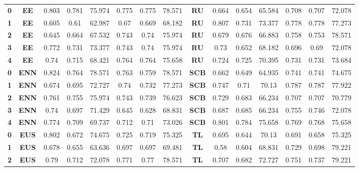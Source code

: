 {{\begin{tabular}{c|c|cccccc|ccccccc}
\textbf{0} & \textbf{EE} & 0.803 & 0.781 & 75.974 & 0.775 & 0.775 & 78.571 & \multicolumn{1}{c|}{\textbf{RU}} & 0.664 & 0.654 & 65.584 & 0.708 & 0.707 & 72.078 \\
\textbf{1} & \textbf{EE} & 0.605 & 0.61  & 62.987 & 0.67  & 0.669 & 68.182 & \multicolumn{1}{c|}{\textbf{RU}} & 0.807 & 0.731 & 73.377 & 0.778 & 0.778 & 77.273 \\
\textbf{2} & \textbf{EE} & 0.645 & 0.664 & 67.532 & 0.743 & 0.74  & 75.974 & \multicolumn{1}{c|}{\textbf{RU}} & 0.679 & 0.676 & 66.883 & 0.758 & 0.753 & 78.571 \\
\textbf{3} & \textbf{EE} & 0.772 & 0.731 & 73.377 & 0.743 & 0.74  & 75.974 & \multicolumn{1}{c|}{\textbf{RU}} & 0.73  & 0.652 & 68.182 & 0.696 & 0.69  & 72.078 \\
\textbf{4} & \textbf{EE} & 0.74  & 0.715 & 68.421 & 0.764 & 0.764 & 75.658 & \multicolumn{1}{c|}{\textbf{RU}} & 0.724 & 0.725 & 70.395 & 0.731 & 0.731 & 73.684 \\
\textbf{0} & \textbf{ENN} & 0.824 & 0.764 & 78.571 & 0.763 & 0.759 & 78.571 & \multicolumn{1}{c|}{\textbf{SCB}} & 0.662 & 0.649 & 64.935 & 0.741 & 0.741 & 74.675 \\
\textbf{1} & \textbf{ENN} & 0.674 & 0.695 & 72.727 & 0.74  & 0.732 & 77.273 & \multicolumn{1}{c|}{\textbf{SCB}} & 0.747 & 0.71  & 70.13 & 0.787 & 0.787 & 77.922 \\
\textbf{2} & \textbf{ENN} & 0.761 & 0.755 & 75.974 & 0.743 & 0.739 & 76.623 & \multicolumn{1}{c|}{\textbf{SCB}} & 0.729 & 0.683 & 66.234 & 0.707 & 0.707 & 70.779 \\
\textbf{3} & \textbf{ENN} & 0.74  & 0.697 & 71.429 & 0.645 & 0.628 & 68.831 & \multicolumn{1}{c|}{\textbf{SCB}} & 0.687 & 0.685 & 66.234 & 0.755 & 0.746 & 72.078 \\
\textbf{4} & \textbf{ENN} & 0.774 & 0.709 & 69.737 & 0.712 & 0.71  & 73.026 & \multicolumn{1}{c|}{\textbf{SCB}} & 0.801 & 0.784 & 75.658 & 0.769 & 0.768 & 75.658 \\
\textbf{0} & \textbf{EUS} & 0.802 & 0.672 & 74.675 & 0.725 & 0.719 & 75.325 & \multicolumn{1}{c|}{\textbf{TL}} & 0.695 & 0.644 & 70.13 & 0.691 & 0.658 & 75.325 \\
\textbf{1} & \textbf{EUS} & 0.678 & 0.655 & 63.636 & 0.697 & 0.697 & 69.481 & \multicolumn{1}{c|}{\textbf{TL}} & 0.58  & 0.604 & 68.831 & 0.729 & 0.698 & 79.221 \\
\textbf{2} & \textbf{EUS} & 0.79  & 0.712 & 72.078 & 0.771 & 0.77  & 78.571 & \multicolumn{1}{c|}{\textbf{TL}} & 0.707 & 0.682 & 72.727 & 0.751 & 0.737 & 79.221 \\

\end{tabular}}}
